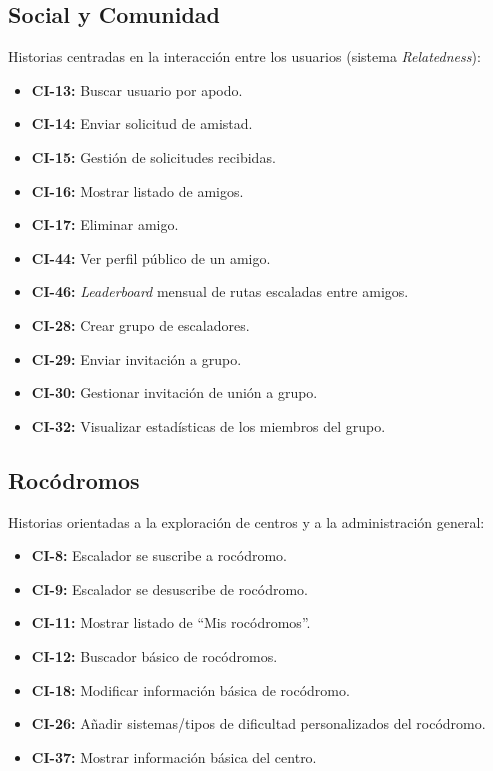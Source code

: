 \subsection{Social y Comunidad}
Historias centradas en la interacción entre los usuarios (sistema \textit{Relatedness}):
\begin{itemize}
    \item \textbf{CI-13:} Buscar usuario por apodo.
    \item \textbf{CI-14:} Enviar solicitud de amistad.
    \item \textbf{CI-15:} Gestión de solicitudes recibidas.
    \item \textbf{CI-16:} Mostrar listado de amigos.
    \item \textbf{CI-17:} Eliminar amigo.
    \item \textbf{CI-44:} Ver perfil público de un amigo.
    \item \textbf{CI-46:} \textit{Leaderboard} mensual de rutas escaladas entre amigos.
    \item \textbf{CI-28:} Crear grupo de escaladores.
    \item \textbf{CI-29:} Enviar invitación a grupo.
    \item \textbf{CI-30:} Gestionar invitación de unión a grupo.
    \item \textbf{CI-32:} Visualizar estadísticas de los miembros del grupo.
\end{itemize}

\subsection{Rocódromos}
Historias orientadas a la exploración de centros y a la administración general:
\begin{itemize}
    \item \textbf{CI-8:} Escalador se suscribe a rocódromo.
    \item \textbf{CI-9:} Escalador se desuscribe de rocódromo.
    \item \textbf{CI-11:} Mostrar listado de ``Mis rocódromos''.
    \item \textbf{CI-12:} Buscador básico de rocódromos.
    \item \textbf{CI-18:} Modificar información básica de rocódromo.
    \item \textbf{CI-26:} Añadir sistemas/tipos de dificultad personalizados del rocódromo.
    \item \textbf{CI-37:} Mostrar información básica del centro.
\end{itemize}

